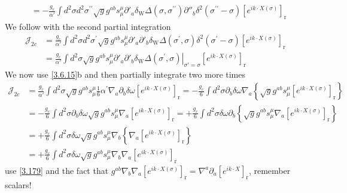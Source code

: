 \begin{tcolorbox}[breakable]
\begin{align}
			&= -\frac{g_c}{\alpha'} \int d^2 \sigma d^2 \sigma^{\prime \prime} \sqrt{g} g^{a b} s_\mu^\mu \partial'_a \delta_{\mathrm{W}} \Delta\left(\sigma, \sigma^{\prime \prime}\right) \partial''_b \delta^2\left(\sigma^{\prime \prime}-\sigma\right)\left[e^{i k \cdot X(\sigma)}\right]_{\mathrm{r}}
		\end{align}
		We follow with the second partial integration
		\begin{align}
			\mathcal{J}_{2 c} &= \frac{g_c}{\alpha'} \int d^2 \sigma d^2 \sigma^{\prime} \sqrt{g} g^{a b} s_\mu^\mu \partial'_a \partial'_b \delta_{\mathrm{W}} \Delta\left(\sigma^{\prime}, \sigma\right) \delta^2\left(\sigma^{\prime}-\sigma\right)\left[e^{i k \cdot X(\sigma)}\right]_{\mathrm{r}} \nonumber \\
			&= \frac{g_c}{\alpha'} \int d^2 \sigma \sqrt{g} g^{a b} s_\mu^\mu\left.\partial'_a \partial'_b \delta_{\mathrm{W}} \Delta\left(\sigma^{\prime}, \sigma\right)\right|_{\sigma'=\sigma}\left[e^{i k \cdot X(\sigma)}\right]_{\mathrm{r}}
		\end{align}
		We now use \eqref{3.6.15}b and then partially integrate two more times
		\begin{align}
			\mathcal{J}_{2 c} &= \frac{g_c}{\alpha'} \int d^2 \sigma \sqrt{g} g^{a b} s_\mu^\mu \frac{1}{6} \alpha^{\prime} \nabla_a \partial_b \delta \omega\left[e^{i k \cdot X(\sigma)}\right]_{\mathrm{r}} = -\frac{g_c}{6} \int d^2 \sigma \partial_b \delta \omega \nabla_a\left\{\sqrt{g} g^{a b} s_\mu^\mu\left[e^{i k \cdot X(\sigma)}\right]_{\mathrm{r}}\right\} \nonumber \\
			&= -\frac{g_c}{6} \int d^2 \sigma \partial_b \delta \omega \sqrt{g} g^{a b} s_\mu^\mu \nabla_a\left[e^{i k \cdot X(\sigma)}\right]_{\mathrm{r}} = +\frac{g_c}{6} \int d^2 \sigma \delta \omega \partial_b\left\{\sqrt{g} g^{a b} s_\mu^\mu \nabla_a\left[e^{i k \cdot X(\sigma)}\right]_{\mathrm{r}}\right\} \nonumber \\
			&= +\frac{g_c}{6} \int d^2 \sigma \delta \omega \sqrt{g} g^{a b} s_\mu^\mu \nabla_b\left\{\nabla_a\left[e^{i k \cdot X(\sigma)}\right]_{\mathrm{r}}\right\} \nonumber \\
			&= +\frac{g_c}{6} \int d^2 \sigma \delta \omega \sqrt{g} g^{a b} s_\mu^\mu \nabla_b \nabla_a\left[e^{i k \cdot X(\sigma)}\right]_{\mathrm{r}}
		\end{align}
		use \eqref{3.179} and the fact that $g^{a b} \nabla_b \nabla_a\left[e^{i k \cdot X(\sigma)}\right]_{\mathrm{r}}=\nabla^a \partial_a\left[e^{i k \cdot X}\right]_{\mathrm{r}}$, remember scalars!
		\begin{align}

\end{align}
\end{tcolorbox}
